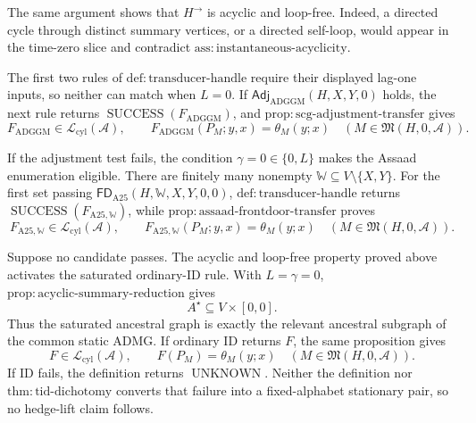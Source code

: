 The same argument shows that \(H^{\to}\) is acyclic and loop-free.  Indeed, a directed cycle through distinct summary vertices, or a directed self-loop, would appear in the time-zero slice and contradict \(\mathrm{ass:instantaneous\text{-}acyclicity}\).

The first two rules of \(\mathrm{def:transducer\text{-}handle}\) require their displayed lag-one inputs, so neither can match when \(L=0\).  If \(\mathsf{Adj}_{\mathrm{ADGGM}}(H,X,Y,0)\) holds, the next rule returns \(\operatorname{SUCCESS}(F_{\mathrm{ADGGM}})\), and \(\mathrm{prop:scg\text{-}adjustment\text{-}transfer}\) gives
\[
 F_{\mathrm{ADGGM}}\in\mathcal L_{\mathrm{cyl}}(\mathcal A),
 \qquad
 F_{\mathrm{ADGGM}}(P_M;y,x)=\theta_M(y;x)
 \quad(M\in\mathfrak M(H,0,\mathcal A)).
\]

If the adjustment test fails, the condition \(\gamma=0\in\{0,L\}\) makes the Assaad enumeration eligible.  There are finitely many nonempty \(\mathbb W\subseteq V\setminus\{X,Y\}\).  For the first set passing \(\mathsf{FD}_{\mathrm{A25}}(H,\mathbb W,X,Y,0,0)\), \(\mathrm{def:transducer\text{-}handle}\) returns \(\operatorname{SUCCESS}(F_{\mathrm{A25},\mathbb W})\), while \(\mathrm{prop:assaad\text{-}frontdoor\text{-}transfer}\) proves
\[
 F_{\mathrm{A25},\mathbb W}\in\mathcal L_{\mathrm{cyl}}(\mathcal A),
 \qquad
 F_{\mathrm{A25},\mathbb W}(P_M;y,x)=\theta_M(y;x)
 \quad(M\in\mathfrak M(H,0,\mathcal A)).
\]

Suppose no candidate passes.  The acyclic and loop-free property proved above activates the saturated ordinary-ID rule.  With \(L=\gamma=0\), \(\mathrm{prop:acyclic\text{-}summary\text{-}reduction}\) gives
\[
 A^\star\subseteq V\times[0,0].
\]
Thus the saturated ancestral graph is exactly the relevant ancestral subgraph of the common static ADMG.  If ordinary ID returns \(F\), the same proposition gives
\[
 F\in\mathcal L_{\mathrm{cyl}}(\mathcal A),
 \qquad
 F(P_M)=\theta_M(y;x)
 \quad(M\in\mathfrak M(H,0,\mathcal A)).
\]
If ID fails, the definition returns \(\operatorname{UNKNOWN}\).  Neither the definition nor \(\mathrm{thm:tid\text{-}dichotomy}\) converts that failure into a fixed-alphabet stationary pair, so no hedge-lift claim follows.

